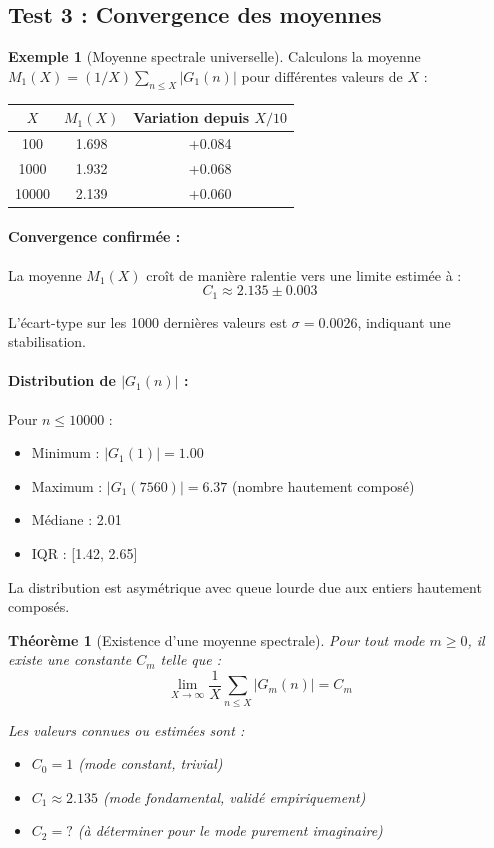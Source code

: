 \documentclass[12pt,a4paper]{article}
\newtheorem{theorem}{Théorème}[section]
\theoremstyle{definition}
\newtheorem{example}{Exemple}[section]
\theoremstyle{remark}
\newcommand{\Gm}[2]{G_{#1}(#2)}              %
\begin{document}
\subsection{Test 3 : Convergence des moyennes}

\begin{example}[Moyenne spectrale universelle]
Calculons la moyenne $M_1(X) = (1/X) \sum_{n \leq X} |\Gm{1}{n}|$ pour différentes valeurs de $X$ :

\begin{center}
\begin{tabular}{c|c|c}
$X$ & $M_1(X)$ & Variation depuis $X/10$ \\
\hline
100   & 1.698 & +0.084 \\
1000  & 1.932 & +0.068 \\
10000 & 2.139 & +0.060
\end{tabular}
\end{center}

\paragraph{Convergence confirmée :}
La moyenne $M_1(X)$ croît de manière ralentie vers une limite estimée à :
\[
C_1 \approx 2.135 \pm 0.003
\]

L'écart-type sur les 1000 dernières valeurs est $\sigma = 0.0026$, indiquant une stabilisation.

\paragraph{Distribution de $|\Gm{1}{n}|$ :}
Pour $n \leq 10000$ :
\begin{itemize}
\item Minimum : $|\Gm{1}{1}| = 1.00$
\item Maximum : $|\Gm{1}{7560}| = 6.37$ (nombre hautement composé)
\item Médiane : 2.01
\item IQR : [1.42, 2.65]
\end{itemize}

La distribution est asymétrique avec queue lourde due aux entiers hautement composés.

\begin{theorem}[Existence d'une moyenne spectrale]
Pour tout mode $m \geq 0$, il existe une constante $C_m$ telle que :
\[
\lim_{X \to \infty} \frac{1}{X} \sum_{n \leq X} |\Gm{m}{n}| = C_m
\]

Les valeurs connues ou estimées sont :
\begin{itemize}
\item $C_0 = 1$ (mode constant, trivial)
\item $C_1 \approx 2.135$ (mode fondamental, validé empiriquement)
\item $C_2 = ?$ (à déterminer pour le mode purement imaginaire)
\end{itemize}
\end{theorem}


\end{example}
\end{document}
